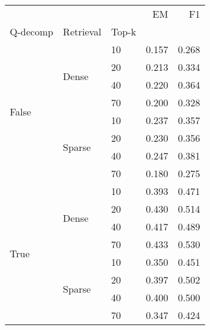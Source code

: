 \begin{tabular}{lllrr}
\toprule
 &  &  & EM & F1 \\
Q-decomp & Retrieval & Top-k &  &  \\
\midrule
\multirow[t]{8}{*}{False} & \multirow[t]{4}{*}{Dense} & 10 & 0.157 & 0.268 \\
 &  & 20 & 0.213 & 0.334 \\
 &  & 40 & 0.220 & 0.364 \\
 &  & 70 & 0.200 & 0.328 \\
\cline{2-5}
 & \multirow[t]{4}{*}{Sparse} & 10 & 0.237 & 0.357 \\
 &  & 20 & 0.230 & 0.356 \\
 &  & 40 & 0.247 & 0.381 \\
 &  & 70 & 0.180 & 0.275 \\
\cline{1-5} \cline{2-5}
\multirow[t]{8}{*}{True} & \multirow[t]{4}{*}{Dense} & 10 & 0.393 & 0.471 \\
 &  & 20 & 0.430 & 0.514 \\
 &  & 40 & 0.417 & 0.489 \\
 &  & 70 & 0.433 & 0.530 \\
\cline{2-5}
 & \multirow[t]{4}{*}{Sparse} & 10 & 0.350 & 0.451 \\
 &  & 20 & 0.397 & 0.502 \\
 &  & 40 & 0.400 & 0.500 \\
 &  & 70 & 0.347 & 0.424 \\
\cline{1-5} \cline{2-5}
\bottomrule
\end{tabular}
